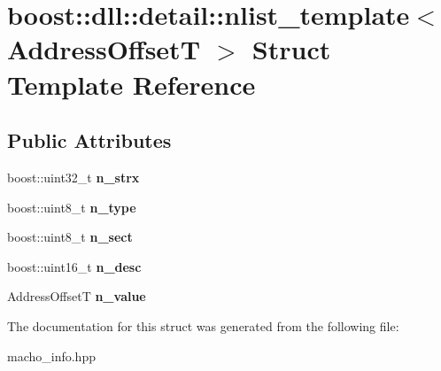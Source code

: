 \hypertarget{a01568}{}\section{boost\+:\+:dll\+:\+:detail\+:\+:nlist\+\_\+template$<$ Address\+OffsetT $>$ Struct Template Reference}
\label{a01568}
\subsection*{Public Attributes}
\begin{DoxyCompactItemize}
\item 
\mbox{\label{a01568_a02011979175132a2403606883049c6aa}} 
boost\+::uint32\+\_\+t {\bfseries n\+\_\+strx}
\item 
\mbox{\label{a01568_a597db10945149a39964a09191115e9f9}} 
boost\+::uint8\+\_\+t {\bfseries n\+\_\+type}
\item 
\mbox{\label{a01568_a409f74be7ba738f62140a22296146086}} 
boost\+::uint8\+\_\+t {\bfseries n\+\_\+sect}
\item 
\mbox{\label{a01568_a2a52c8ee6d401434108c6622f6c86267}} 
boost\+::uint16\+\_\+t {\bfseries n\+\_\+desc}
\item 
\mbox{\label{a01568_a325778c48bc26ca12841388b279f7eb6}} 
Address\+OffsetT {\bfseries n\+\_\+value}
\end{DoxyCompactItemize}


The documentation for this struct was generated from the following file\+:\begin{DoxyCompactItemize}
\item 
macho\+\_\+info.\+hpp\end{DoxyCompactItemize}
